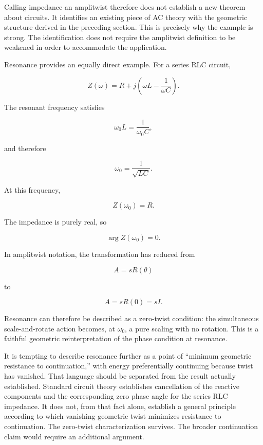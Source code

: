 \documentclass[11pt]{article}
\begin{document}
Calling impedance an amplitwist therefore does not establish a new theorem about circuits. It identifies an existing piece of AC theory with the geometric structure derived in the preceding section. This is precisely why the example is strong. The identification does not require the amplitwist definition to be weakened in order to accommodate the application.

Resonance provides an equally direct example. For a series RLC circuit,

\begin{equation}
Z(\omega)
=
R+j\left(
\omega L-\frac{1}{\omega C}
\right).
\end{equation}

The resonant frequency satisfies

\begin{equation}
\omega_0 L
=
\frac{1}{\omega_0 C},
\end{equation}

and therefore

\begin{equation}
\omega_0
=
\frac{1}{\sqrt{LC}}.
\end{equation}

At this frequency,

\begin{equation}
Z(\omega_0)=R.
\end{equation}

The impedance is purely real, so

\begin{equation}
\arg Z(\omega_0)=0.
\end{equation}

In amplitwist notation, the transformation has reduced from

\begin{equation}
A=sR(\theta)
\end{equation}

to

\begin{equation}
A=sR(0)=sI.
\end{equation}

Resonance can therefore be described as a zero-twist condition: the simultaneous scale-and-rotate action becomes, at $\omega_0$, a pure scaling with no rotation. This is a faithful geometric reinterpretation of the phase condition at resonance.

It is tempting to describe resonance further as a point of ``minimum geometric resistance to continuation,'' with energy preferentially continuing because twist has vanished. That language should be separated from the result actually established. Standard circuit theory establishes cancellation of the reactive components and the corresponding zero phase angle for the series RLC impedance. It does not, from that fact alone, establish a general principle according to which vanishing geometric twist minimizes resistance to continuation. The zero-twist characterization survives. The broader continuation claim would require an additional argument.
\end{document}
